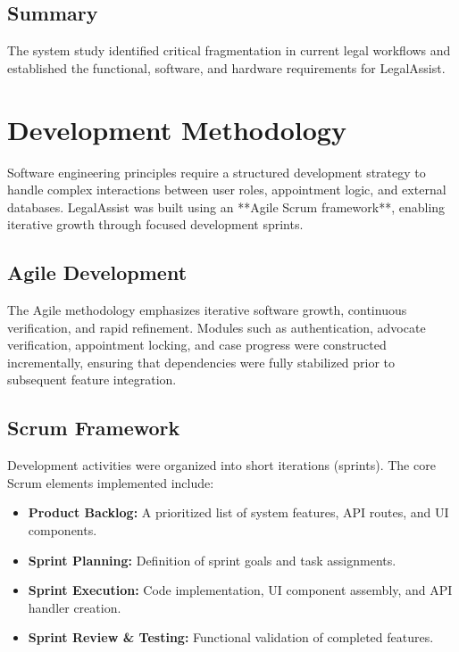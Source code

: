 \documentclass[12pt,a4paper]{report}
\begin{document}
\section{Summary}
The system study identified critical fragmentation in current legal workflows and established the functional, software, and hardware requirements for LegalAssist.

\chapter{Development Methodology}

Software engineering principles require a structured development strategy to handle complex interactions between user roles, appointment logic, and external databases. LegalAssist was built using an **Agile Scrum framework**, enabling iterative growth through focused development sprints.

\section{Agile Development}
The Agile methodology emphasizes iterative software growth, continuous verification, and rapid refinement. Modules such as authentication, advocate verification, appointment locking, and case progress were constructed incrementally, ensuring that dependencies were fully stabilized prior to subsequent feature integration.

\section{Scrum Framework}
Development activities were organized into short iterations (sprints). The core Scrum elements implemented include:
\begin{itemize}
    \item \textbf{Product Backlog:} A prioritized list of system features, API routes, and UI components.
    \item \textbf{Sprint Planning:} Definition of sprint goals and task assignments.
    \item \textbf{Sprint Execution:} Code implementation, UI component assembly, and API handler creation.
    \item \textbf{Sprint Review \& Testing:} Functional validation of completed features.
\end{itemize}
\end{document}
